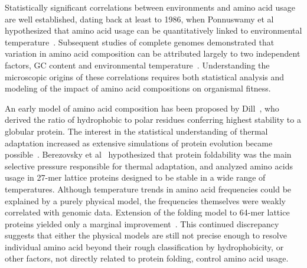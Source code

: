 \documentclass[10pt,letterpaper]{article}
\begin{document}
Statistically significant correlations between environments and amino acid usage are well established, dating back at least to 1986, when Ponnuswamy et al hypothesized that amino acid usage can be quantitatively linked to environmental temperature~\cite{Ponnuswamy1986Amino}.
Subsequent studies of complete genomes demonstrated that variation in amino acid composition can be attributed largely to two independent factors,  GC content and environmental  temperature~\cite{Kreil2001Identification,Singer2003Thermophilic}. Understanding the microscopic origins of these correlations requires both statistical analysis and modeling of the impact of amino acid compositions on organismal fitness. 



An early model of amino acid composition has been proposed by Dill~\cite{Dill1985Theory}, who derived the ratio of hydrophobic to polar residues conferring highest stability to a globular protein. %
The interest in the statistical understanding of thermal adaptation increased as extensive simulations of protein evolution became possible~\cite{Taverna2002Why,Bloom2006Protein,Goldstein2008The}. Berezovsky et al~\cite{Berezovsky2007Positive} hypothesized that protein foldability was the main selective pressure responsible for thermal adaptation, and analyzed amino acids usage in 27-mer lattice proteins designed to be stable in a wide range of temperatures. Although temperature trends in amino acid frequencies could be explained by a purely physical model, the frequencies themselves were weakly correlated with genomic data. Extension of the folding model to 64-mer lattice proteins yielded only a marginal improvement~\cite{Venev2015Massively}. This continued discrepancy suggests that either the physical models are still not precise enough to resolve individual amino acid  beyond their rough classification by hydrophobicity, or other factors, not directly related to protein folding, control amino acid usage.
\end{document}
